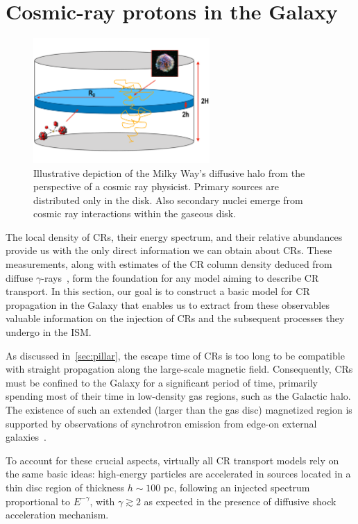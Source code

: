 \section{Cosmic-ray protons in the Galaxy}
\label{sec:protons}

\begin{figure}[t]
\centering
\includegraphics[width=0.6\textwidth]{figures/halo.pdf}
\caption{Illustrative depiction of the Milky Way's diffusive halo from the perspective of a cosmic ray physicist. Primary sources are distributed only in the disk. Also secondary nuclei emerge from cosmic ray interactions within the gaseous disk.}
\label{fig:galaxy}
\end{figure}

The local density of CRs, their energy spectrum, and their relative abundances provide us with the only direct information we can obtain about CRs. These measurements, along with estimates of the CR column density deduced from diffuse $\gamma$-rays~\cite{Tibaldo2021universe, Grenier2015araa}, form the foundation for any model aiming to describe CR transport.
%
In this section, our goal is to construct a basic model for CR propagation in the Galaxy that enables us to extract from these observables valuable information on the injection of CRs and the subsequent processes they undergo in the ISM.

As discussed in~\cref{sec:pillar}, the escape time of CRs is too long to be compatible with straight propagation along the large-scale magnetic field. Consequently, CRs must be confined to the Galaxy for a significant period of time, primarily spending most of their time in low-density gas regions, such as the Galactic halo.
%
The existence of such an extended (larger than the gas disc) magnetized region is supported by observations of synchrotron emission from edge-on external galaxies~\cite{Beck2015aar}.

To account for these crucial aspects, virtually all CR transport models rely on the same basic ideas: high-energy particles are accelerated in sources located in a thin disc region of thickness $h \sim 100$ pc, following an injected spectrum proportional to $E^{-\gamma}$, with $\gamma \gtrsim 2$ as expected in the presence of diffusive shock acceleration mechanism.

